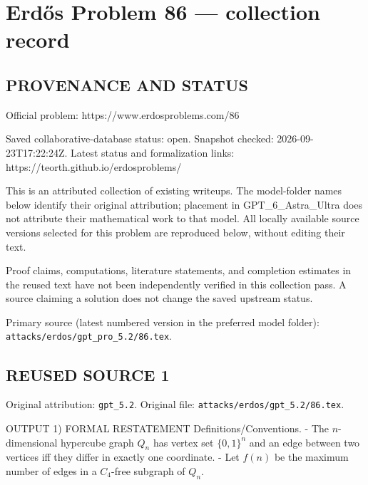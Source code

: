 \section*{Erd\H{o}s Problem 86 --- collection record}

\subsection*{PROVENANCE AND STATUS}
Official problem: https://www.erdosproblems.com/86

Saved collaborative-database status: open.
Snapshot checked: 2026-09-23T17:22:24Z.
Latest status and formalization links: https://teorth.github.io/erdosproblems/

This is an attributed collection of existing writeups. The model-folder names below identify their original attribution; placement in GPT\_6\_Astra\_Ultra does not attribute their mathematical work to that model. All locally available source versions selected for this problem are reproduced below, without editing their text.

Proof claims, computations, literature statements, and completion estimates in the reused text have not been independently verified in this collection pass. A source claiming a solution does not change the saved upstream status.

Primary source (latest numbered version in the preferred model folder): \texttt{attacks/erdos/gpt\_pro\_5.2/86.tex}.

\subsection*{REUSED SOURCE 1}
Original attribution: \texttt{gpt\_5.2}.
Original file: \texttt{attacks/erdos/gpt\_5.2/86.tex}.


OUTPUT
1) FORMAL RESTATEMENT
Definitions/Conventions.
- The $n$-dimensional hypercube graph $Q_n$ has vertex set $\{0,1\}^n$ and an edge between two vertices iff they differ in exactly one coordinate.
- Let $f(n)$ be the maximum number of edges in a $C_4$-free subgraph of $Q_n$.

